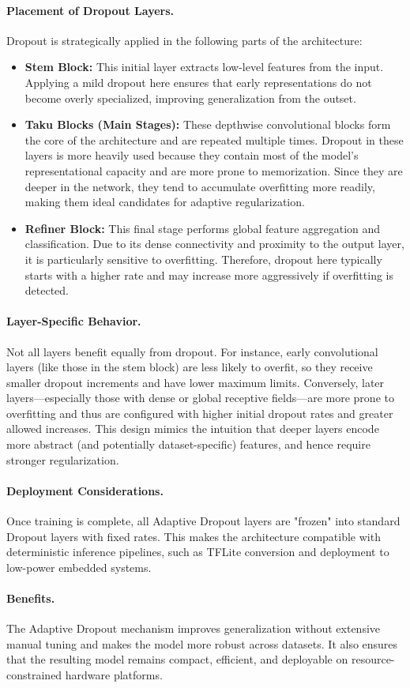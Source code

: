 \paragraph{Placement of Dropout Layers.} Dropout is strategically applied in the following parts of the architecture:
\begin{itemize}
    \item \textbf{Stem Block:} This initial layer extracts low-level features from the input. Applying a mild dropout here ensures that early representations do not become overly specialized, improving generalization from the outset.
    \item \textbf{Taku Blocks (Main Stages):} These depthwise convolutional blocks form the core of the architecture and are repeated multiple times. Dropout in these layers is more heavily used because they contain most of the model’s representational capacity and are more prone to memorization. Since they are deeper in the network, they tend to accumulate overfitting more readily, making them ideal candidates for adaptive regularization.
    \clearpage
    \item \textbf{Refiner Block:} This final stage performs global feature aggregation and classification. Due to its dense connectivity and proximity to the output layer, it is particularly sensitive to overfitting. Therefore, dropout here typically starts with a higher rate and may increase more aggressively if overfitting is detected.
\end{itemize}

\paragraph{Layer-Specific Behavior.} Not all layers benefit equally from dropout. For instance, early convolutional layers (like those in the stem block) are less likely to overfit, so they receive smaller dropout increments and have lower maximum limits. Conversely, later layers—especially those with dense or global receptive fields—are more prone to overfitting and thus are configured with higher initial dropout rates and greater allowed increases. This design mimics the intuition that deeper layers encode more abstract (and potentially dataset-specific) features, and hence require stronger regularization.

\paragraph{Deployment Considerations.} Once training is complete, all Adaptive Dropout layers are "frozen" into standard Dropout layers with fixed rates. This makes the architecture compatible with deterministic inference pipelines, such as TFLite conversion and deployment to low-power embedded systems.

\paragraph{Benefits.} The Adaptive Dropout mechanism improves generalization without extensive manual tuning and makes the model more robust across datasets. It also ensures that the resulting model remains compact, efficient, and deployable on resource-constrained hardware platforms.

